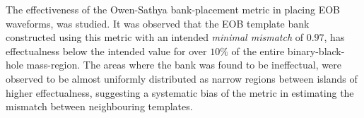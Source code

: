 \documentclass[aps,
prd,
amsmath,
amssymb,
twocolumn,
floatfix,
groupedaddress]{revtex4-1}
\begin{document}
The effectiveness of the Owen-Sathya bank-placement metric in placing EOB waveforms, was studied. It was observed that the EOB template bank constructed using this metric with an intended \textit{minimal mismatch} of $0.97$, has effectualness below the intended value for over $10\%$ of the entire binary-black-hole mass-region. The areas where the bank was found to be ineffectual, were observed to be almost uniformly distributed as narrow regions between islands of higher effectualness, suggesting a systematic bias of the metric \citep{SathyaMetric2PN} in estimating the mismatch between neighbouring templates.


%


\end{document}
